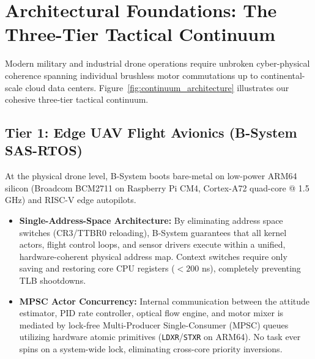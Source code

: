 \documentclass[10pt,journal,compsoc,twocolumn]{article}
\begin{document}
\section{Architectural Foundations: The Three-Tier Tactical Continuum}
\label{sec:continuum}

Modern military and industrial drone operations require unbroken cyber-physical coherence spanning individual brushless motor commutations up to continental-scale cloud data centers. Figure~\ref{fig:continuum_architecture} illustrates our cohesive three-tier tactical continuum.

\subsection{Tier 1: Edge UAV Flight Avionics (B-System SAS-RTOS)}
At the physical drone level, B-System boots bare-metal on low-power ARM64 silicon (Broadcom BCM2711 on Raspberry Pi CM4, Cortex-A72 quad-core @ 1.5 GHz) and RISC-V edge autopilots.
\begin{itemize}[leftmargin=*]
    \item \textbf{Single-Address-Space Architecture:} By eliminating address space switches (CR3/TTBR0 reloading), B-System guarantees that all kernel actors, flight control loops, and sensor drivers execute within a unified, hardware-coherent physical address map. Context switches require only saving and restoring core CPU registers ($<200$ ns), completely preventing TLB shootdowns.
    \item \textbf{MPSC Actor Concurrency:} Internal communication between the attitude estimator, PID rate controller, optical flow engine, and motor mixer is mediated by lock-free Multi-Producer Single-Consumer (MPSC) queues utilizing hardware atomic primitives (\texttt{LDXR}/\texttt{STXR} on ARM64). No task ever spins on a system-wide lock, eliminating cross-core priority inversions.
\end{itemize}
\end{document}
